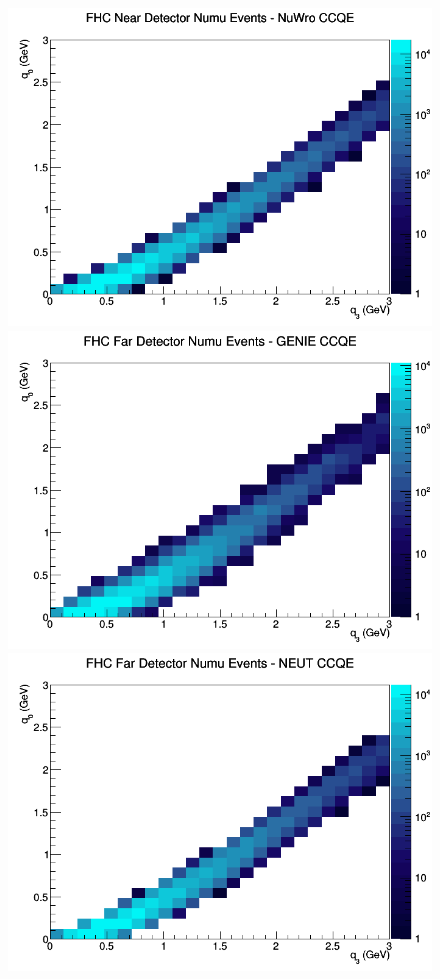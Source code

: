 \documentclass[12pt]{article}
\begin{document}
\begin{figure}[h]
\includegraphics[width=\linewidth]{q0_q3/nominal/CCQE_FHC_ND_numu_q3_q0_NuWro.png}
\endminipage
\newline
{}
\includegraphics[width=\linewidth]{q0_q3/nominal/CCQE_FHC_FD_numu_q3_q0_GENIE.png}
\endminipage
{}
\includegraphics[width=\linewidth]{q0_q3/nominal/CCQE_FHC_FD_numu_q3_q0_NEUT.png}

\end{figure}
\end{document}
